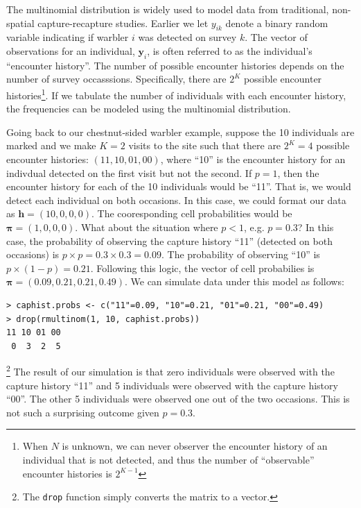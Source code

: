 The multinomial distribution is widely used to model data from traditional,
non-spatial capture-recapture studies.
Earlier we let $y_{ik}$ denote a binary random variable indicating if
warbler $i$ was detected on survey $k$. The vector of observations for an
individual, $\mathbf{y}_i$, is often referred to as the individual's
``encounter history''. The number of possible encounter
histories depends on the number of survey occasssions. Specifically,
there are $2^K$
possible encounter histories\footnote{When $N$ is unknown, we can
  never observer the encounter history of an individual that is not
  detected, and thus the number of ``observable'' encounter histories
  is $2^{K-1}$}.
If we tabulate the number of individuals with each encounter history,
the frequencies can be modeled using the multinomial
distribution. %

Going back to our
chestnut-sided warbler example, suppose the 10 individuals are marked
and we make $K=2$ visits to the site such that there are $2^K = 4$ possible encounter
histories: $(11, 10, 01, 00)$, where ``10'' is the
encounter history for an indivdual detected on the first visit but not
the second. If $p=1$, then the
encounter history for each of the 10 individuals would be ``11''. That
is, we would detect each individual on both occasions. In this case,
we could format our data as $\mathbf{h} = (10, 0, 0, 0)$. The
cooresponding cell probabilities would be $\bm{\pi} = (1, 0, 0,
0)$. What about the situation where $p<1$, e.g. $p=0.3$? In this case, the
probability of observing the capture history ``11'' (detected on both
occasions) is $p \times p = 0.3 \times 0.3 = 0.09$. The probability of
observing ``10'' is $p \times (1-p) = 0.21$. Following this logic, the vector
of cell probabilies is $\bm{\pi} = (0.09, 0.21, 0.21, 0.49)$. We can
simulate data under this model as follows:
\begin{verbatim}
> caphist.probs <- c("11"=0.09, "10"=0.21, "01"=0.21, "00"=0.49)
> drop(rmultinom(1, 10, caphist.probs))
11 10 01 00
 0  3  2  5
\end{verbatim}\footnote{The \verb+drop+ function simply converts the matrix to a vector.}
The
result of our simulation is that zero individuals were observed with
the capture history ``11'' and 5 individuals were observed with the
capture history ``00''. The other 5 individuals were observed one out
of the two occasions. This is not such a surprising outcome given
$p=0.3$.

